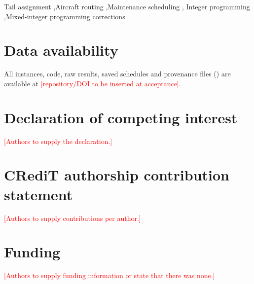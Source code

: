 \documentclass[review, 12pt, authoryear]{elsarticle}
\theoremstyle{plain}
\theoremstyle{definition}
\theoremstyle{remark}
\newcommand{\confirm}[1]{\textcolor{red}{[#1]}}
\begin{document}
\begin{frontmatter}
\begin{keyword}
Tail assignment \sep Aircraft routing \sep Maintenance scheduling \sep
Integer programming \sep Mixed-integer programming corrections
\end{keyword}

\end{frontmatter}









\section*{Data availability}
All instances, code, raw results, saved schedules and provenance files
() are available at \confirm{repository/DOI to be inserted
at acceptance}.

\section*{Declaration of competing interest}
\confirm{Authors to supply the declaration.}

\section*{CRediT authorship contribution statement}
\confirm{Authors to supply contributions per author.}

\section*{Funding}
\confirm{Authors to supply funding information or state that there was none.}





\end{document}
